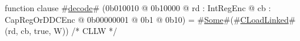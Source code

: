 function clause #\hyperref[zdecode]{decode}# (0b010010 @ 0b10000 @ rd : IntRegEnc @ cb : CapRegOrDDCEnc @ 0b00000001 @ 0b1 @ 0b10) = #\hyperref[zSome]{Some}#(#\hyperref[zCLoadLinked]{CLoadLinked}#(rd, cb, true,  W)) /* CLLW  */
